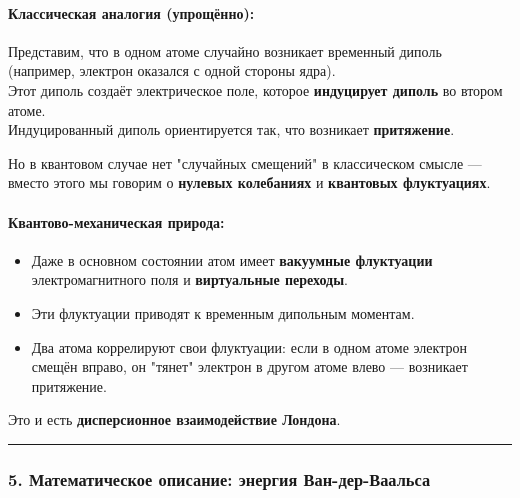 \documentclass[11pt]{article}
\providecommand{\tightlist}{%
      \setlength{\itemsep}{0pt}\setlength{\parskip}{0pt}}
\begin{document}
\paragraph{Классическая аналогия
(упрощённо):}\label{ux43aux43bux430ux441ux441ux438ux447ux435ux441ux43aux430ux44f-ux430ux43dux430ux43bux43eux433ux438ux44f-ux443ux43fux440ux43eux449ux451ux43dux43dux43e}

Представим, что в одном атоме случайно возникает временный диполь
(например, электрон оказался с одной стороны ядра).\\
Этот диполь создаёт электрическое поле, которое \textbf{индуцирует
диполь} во втором атоме.\\
Индуцированный диполь ориентируется так, что возникает
\textbf{притяжение}.

Но в квантовом случае нет "случайных смещений" в классическом смысле ---
вместо этого мы говорим о \textbf{нулевых колебаниях} и
\textbf{квантовых флуктуациях}.

\paragraph{Квантово-механическая
природа:}\label{ux43aux432ux430ux43dux442ux43eux432ux43e-ux43cux435ux445ux430ux43dux438ux447ux435ux441ux43aux430ux44f-ux43fux440ux438ux440ux43eux434ux430}

\begin{itemize}
\tightlist
\item
  Даже в основном состоянии атом имеет \textbf{вакуумные флуктуации}
  электромагнитного поля и \textbf{виртуальные переходы}.
\item
  Эти флуктуации приводят к временным дипольным моментам.
\item
  Два атома коррелируют свои флуктуации: если в одном атоме электрон
  смещён вправо, он "тянет" электрон в другом атоме влево --- возникает
  притяжение.
\end{itemize}

Это и есть \textbf{дисперсионное взаимодействие Лондона}.

\begin{center}\rule{0.5\linewidth}{\linethickness}\end{center}

\subsubsection{5. Математическое описание: энергия
Ван-дер-Ваальса}\label{ux43cux430ux442ux435ux43cux430ux442ux438ux447ux435ux441ux43aux43eux435-ux43eux43fux438ux441ux430ux43dux438ux435-ux44dux43dux435ux440ux433ux438ux44f-ux432ux430ux43d-ux434ux435ux440-ux432ux430ux430ux43bux44cux441ux430}
\end{document}
